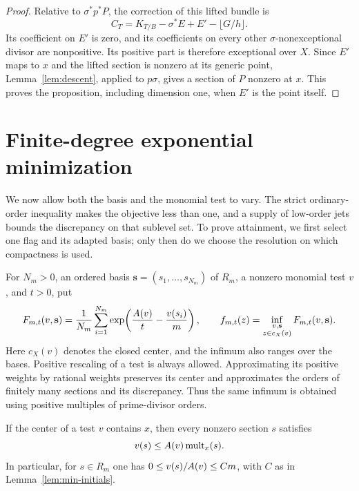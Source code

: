 \begin{proof}
Relative to $\sigma^*p^*P$, the correction of this lifted bundle is
\[
 C_T=K_{T/B}-\sigma^*E+E'-\lfloor G/h\rfloor.
\]
Its coefficient on $E'$ is zero, and its coefficients on every other
$\sigma$-nonexceptional divisor are nonpositive. Its positive part is
therefore exceptional over $X$. Since $E'$ maps to $x$ and the lifted
section is nonzero at its generic point, Lemma~\ref{lem:descent}, applied
to $p\sigma$, gives a section of $P$ nonzero at $x$. This proves the
proposition, including dimension one, when $E'$ is the point itself.
\end{proof}

\section{Finite-degree exponential minimization}
\label{sec:min-exponential}

We now allow both the basis and the monomial test to vary. The strict
ordinary-order inequality makes the objective less than one, and a
supply of low-order jets bounds the discrepancy on that sublevel set.
To prove attainment, we first select one flag and its adapted basis;
only then do we choose the resolution on which compactness is used.

For $N_m>0$, an ordered basis $\mathbf s=(s_1,\ldots,s_{N_m})$ of
$R_m$, a nonzero monomial test $v$, and $t>0$, put
\begin{equation}
\label{eq:min-objective}
 F_{m,t}(v,\mathbf s)
  =\frac1{N_m}\sum_{i=1}^{N_m}
       \exp\!\left(\frac{A(v)}t-\frac{v(s_i)}m\right),
 \qquad
 f_{m,t}(z)=\inf_{\substack{v,\mathbf s\\z\in c_X(v)}}
                F_{m,t}(v,\mathbf s).
\end{equation}
Here $c_X(v)$ denotes the closed center, and the infimum also ranges
over the bases. Positive rescaling of a test is always allowed.
Approximating its positive weights by rational weights preserves its
center and approximates the orders of finitely many sections and its
discrepancy. Thus the same infimum is obtained using positive multiples
of prime-divisor orders.

\begin{lemma}
\label{lem:min-order-bound}
If the center of a test $v$ contains $x$, then every nonzero section
$s$ satisfies
\begin{equation}
\label{eq:min-order-bound}
 v(s)\leq A(v)\operatorname{mult}_x(s).
\end{equation}
In particular, for $s\in R_m$ one has
$0\leq v(s)/A(v)\leq Cm$, with $C$ as in
Lemma~\ref{lem:min-initials}.
\end{lemma}

